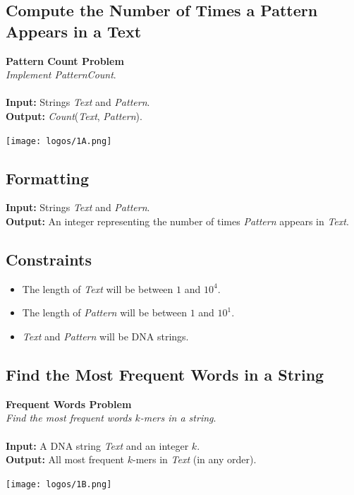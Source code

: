 \documentclass{article}
\begin{document}
\subsection{Compute the Number of Times a Pattern Appears in a Text}
\hline\vspace{5}
\noindent \textbf{Pattern Count Problem}\\
\emph{Implement PatternCount}.\\ \\
\textbf{Input:} Strings \emph{Text} and \emph{Pattern}.\\
\textbf{Output:} \emph{Count}(\emph{Text}, \emph{Pattern}).
\begin{center}
    \texttt{[image: logos/1A.png]} 
\end{center}
\hline\vspace{5}

\subsection*{Formatting}
\textbf{Input:} Strings \emph{Text} and \emph{Pattern}.\\
\noindent \textbf{Output:} An integer representing the number of times \emph{Pattern} appears in \emph{Text}.

\subsection*{Constraints}
\begin{itemize}
    \item The length of \emph{Text} will be between $1$ and $10^4$.
    \item The length of \emph{Pattern} will be between $1$ and $10^1$.
    \item \emph{Text} and \emph{Pattern} will be DNA strings.
\end{itemize}
\pagebreak
\subsection{Find the Most Frequent Words in a String}
\hline\vspace{5}
\noindent \textbf{Frequent Words Problem}\\
\emph{Find the most frequent words $k$-mers in a string}.\\ \\
\textbf{Input:} A DNA string \emph{Text} and an integer $k$.\\
\textbf{Output:} All most frequent $k$-mers in \emph{Text} (in any order).
\begin{center}
    \texttt{[image: logos/1B.png]} 
\end{center}
\hline\vspace{5}
\end{document}
